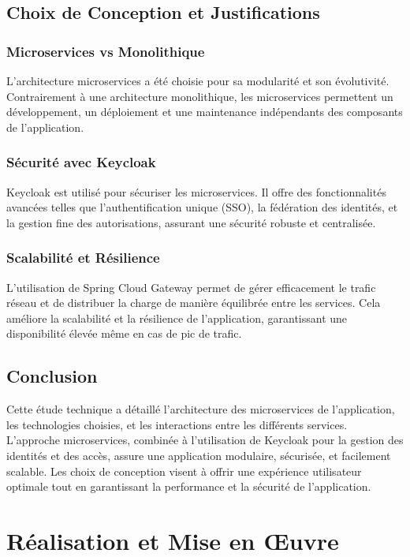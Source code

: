 \documentclass[a4paper, 11pt, openany]{report}
\begin{document}
\section{Choix de Conception et Justifications}
\subsection{Microservices vs Monolithique}
L'architecture microservices a été choisie pour sa modularité et son évolutivité. Contrairement à une architecture monolithique, les microservices permettent un développement, un déploiement et une maintenance indépendants des composants de l'application.

\subsection{Sécurité avec Keycloak}
Keycloak est utilisé pour sécuriser les microservices. Il offre des fonctionnalités avancées telles que l'authentification unique (SSO), la fédération des identités, et la gestion fine des autorisations, assurant une sécurité robuste et centralisée.

\subsection{Scalabilité et Résilience}
L'utilisation de Spring Cloud Gateway permet de gérer efficacement le trafic réseau et de distribuer la charge de manière équilibrée entre les services. Cela améliore la scalabilité et la résilience de l'application, garantissant une disponibilité élevée même en cas de pic de trafic.

\section{Conclusion}
Cette étude technique a détaillé l'architecture des microservices de l'application, les technologies choisies, et les interactions entre les différents services. L'approche microservices, combinée à l'utilisation de Keycloak pour la gestion des identités et des accès, assure une application modulaire, sécurisée, et facilement scalable. Les choix de conception visent à offrir une expérience utilisateur optimale tout en garantissant la performance et la sécurité de l'application.
\chapter{Réalisation et Mise en Œuvre}
\end{document}
